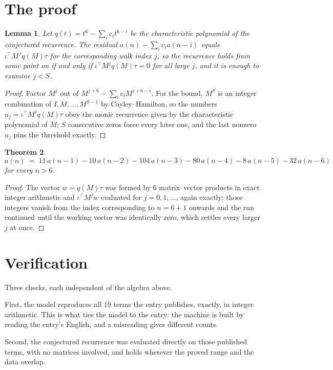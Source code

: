 \documentclass[11pt,a4paper]{article}
\theoremstyle{plain}
\newtheorem{theorem}{Theorem}
\newtheorem{lemma}[theorem]{Lemma}
\theoremstyle{definition}
\begin{document}
\section{The proof}

\begin{lemma}\label{lem:crit}
Let $q(t)=t^{6}-\sum_i c_it^{6-i}$ be the characteristic polynomial of the
conjectured recurrence. The residual $a(n)-\sum_ic_ia(n-i)$ equals
$\iota^{\!\top}M^{\,j}q(M)\tau$ for the corresponding walk index $j$, so the recurrence
holds from some point on if and only if $\iota^{\!\top}M^{j}q(M)\tau=0$ for all large $j$,
and it is enough to examine $j<S$.
\end{lemma}

\begin{proof}
Factor $M^{j}$ out of $M^{j+6}-\sum_ic_iM^{j+6-i}$. For the bound, $M^{S}$
is an integer combination of $I,M,\dots,M^{S-1}$ by Cayley--Hamilton, so the numbers
$u_j=\iota^{\!\top}M^{j}q(M)\tau$ obey the monic recurrence given by the characteristic
polynomial of $M$; $S$ consecutive zeros force every later one, and the last nonzero $u_j$
pins the threshold exactly.
\end{proof}

\begin{theorem}
\[
a(n)\;=\;11\,a(n-1) - 10\,a(n-2) - 104\,a(n-3) - 80\,a(n-4) - 8\,a(n-5) - 32\,a(n-6)
\]
for every $n>6$.
\end{theorem}

\begin{proof}
The vector $w=q(M)\tau$ was formed by $6$ matrix--vector products in exact integer
arithmetic and $\iota^{\!\top}M^{j}w$ evaluated for $j=0,1,\dots$, again exactly; those
integers vanish from the index corresponding to $n=6+1$ onwards and the run continued
until the working vector was identically zero, which settles every larger $j$ at once.
\end{proof}

\section{Verification}

Three checks, each independent of the algebra above.

First, the model reproduces all $19$ terms the entry publishes, exactly, in integer
arithmetic. This is what ties the model to the entry: the machine is built by reading the
entry's English, and a misreading gives different counts.

Second, the conjectured recurrence was evaluated directly on those published terms, with no
matrices involved, and holds wherever the proved range and the data overlap.
\end{document}

